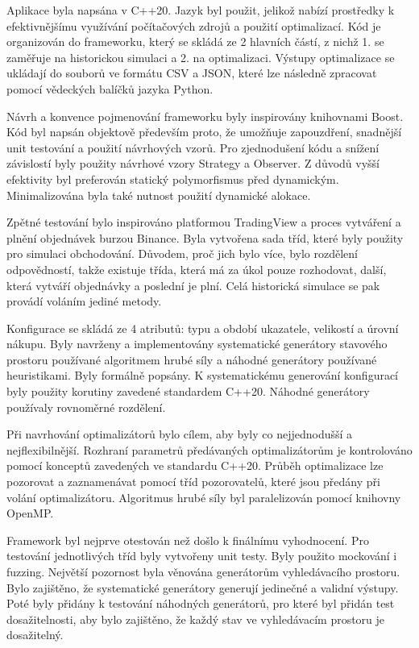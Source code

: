 Aplikace byla napsána v C++20.
Jazyk byl použit, jelikož nabízí prostředky k efektivnějšímu využívání počítačových zdrojů a použití optimalizací.
Kód je organizován do frameworku, který se skládá ze 2 hlavních částí, z nichž 1. se zaměřuje na historickou simulaci a 2. na optimalizaci.
Výstupy optimalizace se ukládají do souborů ve formátu CSV a JSON, které lze následně zpracovat pomocí vědeckých balíčků jazyka Python.

Návrh a konvence pojmenování frameworku byly inspirovány knihovnami Boost.
Kód byl napsán objektově především proto, že umožňuje zapouzdření, snadnější unit testování a použití návrhových vzorů.
Pro zjednodušení kódu a snížení závislostí byly použity návrhové vzory Strategy a Observer.
Z důvodů vyšší efektivity byl preferován statický polymorfismus před dynamickým.
Minimalizována byla také nutnost použití dynamické alokace.

Zpětné testování bylo inspirováno platformou TradingView a proces vytváření a plnění objednávek burzou Binance.
Byla vytvořena sada tříd, které byly použity pro simulaci obchodování.
Důvodem, proč jich bylo více, bylo rozdělení odpovědností, takže existuje třída, která má za úkol pouze rozhodovat, další, která vytváří objednávky a poslední je plní.
Celá historická simulace se pak provádí voláním jediné metody.

Konfigurace se skládá ze 4 atributů: typu a období ukazatele, velikostí a úrovní nákupu.
Byly navrženy a implementovány systematické generátory stavového prostoru používané algoritmem hrubé síly a náhodné generátory používané heuristikami.
Byly formálně popsány.
K systematickému generování konfigurací byly použity korutiny zavedené standardem C++20.
Náhodné generátory používaly rovnoměrné rozdělení.

Při navrhování optimalizátorů bylo cílem, aby byly co nejjednodušší a nejflexibilnější.
Rozhraní parametrů předávaných optimalizátorům je kontrolováno pomocí konceptů zavedených ve standardu C++20.
Průběh optimalizace lze pozorovat a zaznamenávat pomocí tříd pozorovatelů, které jsou předány při volání optimalizátoru.
Algoritmus hrubé síly byl paralelizován pomocí knihovny OpenMP.

Framework byl nejprve otestován než došlo k finálnímu vyhodnocení.
Pro testování jednotlivých tříd byly vytvořeny unit testy.
Byly použito mockování i fuzzing.
Největší pozornost byla věnována generátorům vyhledávacího prostoru.
Bylo zajištěno, že systematické generátory generují jedinečné a validní výstupy.
Poté byly přidány k testování náhodných generátorů, pro které byl přidán test dosažitelnosti, aby bylo zajištěno, že každý stav ve vyhledávacím prostoru je dosažitelný.

